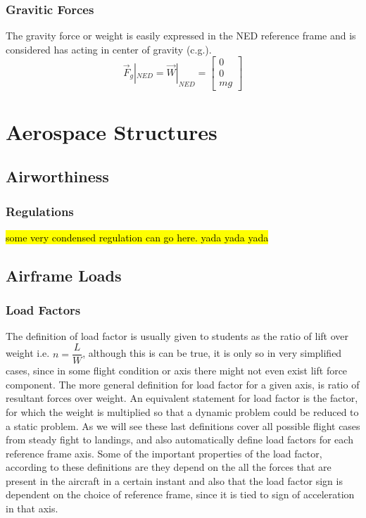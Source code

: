 \subsection{Gravitic Forces}
The gravity force or weight is easily expressed in the NED reference frame and is considered has acting in center of gravity (c.g.).
\begin{equation}
  \vec{F}_g|_{NED} =
  \vec{W}|_{NED} =
    \begin{bmatrix}
      0\\
      0\\
      mg
    \end{bmatrix}
\end{equation}









\chapter{Aerospace Structures}

\newpage
\section{Airworthiness}


\subsection{Regulations}
\hl{some very condensed regulation can go here. yada yada yada}


\newpage
\section{Airframe Loads}



\subsection{Load Factors}
The definition of load factor is usually given to students as the ratio of lift over weight i.e. $n= \dfrac{L}{W}$, although this is can be true,
it is only so in very simplified cases, since in some flight condition or axis there might not even exist lift force component.
The more general definition for load factor for a given axis, is ratio of resultant forces over weight.
An equivalent statement for load factor is the factor, for which the weight is multiplied so that a dynamic problem could be reduced to a static problem.
As we will see these last definitions cover all possible flight cases from steady fight to landings, and also automatically define load factors
for each reference frame axis.
Some of the important properties of the load factor, according to these definitions are they depend on the all the forces that are present
in the aircraft in a certain instant and also that the load factor sign is dependent on the choice of reference frame, since it is tied to
sign of acceleration in that axis.

